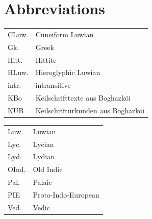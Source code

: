 \documentclass[output=paper,colorlinks,citecolor=brown]{langscibook}
\begin{document}
\section*{Abbreviations}
\begin{tabularx}{.55\textwidth}{lQ}
CLuw. & Cuneiform Luwian \\
Gk. & Greek \\
Hitt. & Hittite \\
HLuw. & Hieroglyphic Luwian \\
intr. & intransitive\\
KBo & Keilschrifttexte aus Boghazköi \\
KUB & Keilschrifturkunden aus Boghazköi \\
\end{tabularx}
\begin{tabularx}{.43\textwidth}{lQ}
Luw. & Luwian \\
Lyc. & Lycian \\
Lyd. & Lydian \\
OInd. & Old Indic \\
Pal. & Palaic \\
PIE & Proto-Indo-European \\
Ved. & Vedic \\
\end{tabularx}
 
{\sloppy\printbibliography[heading=subbibliography,notkeyword=this]}
\end{document}
